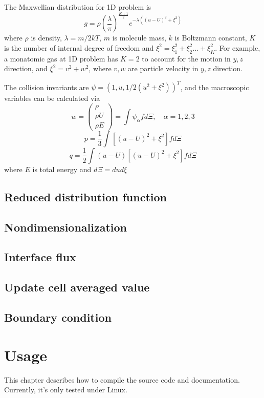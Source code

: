 \documentclass{book}
\begin{document}
The Maxwellian distribution for 1D problem is
\begin{equation}
    g=\rho\left(\frac{\lambda}{\pi}\right)^{\frac{K+1}{2}}e^{-\lambda((u-U)^2+\xi^2)}
\end{equation}
where $\rho$ is density, $\lambda=m/2kT$, $m$ is molecule mass, $k$ is Boltzmann constant, $K$ is the number of internal degree of freedom and $\xi^2=\xi_1^2+\xi_2^2...+\xi_K^2$. For example, a monatomic gas at 1D problem has $K=2$ to account for the motion in $y,z$ direction, and $\xi^2=v^2+w^2$, where $v,w$ are particle velocity in $y,z$ direction.

The collision invariants are $\psi=(1,u,1/2(u^2+\xi^2))^T$, and the macroscopic variables can be calculated via
\begin{equation}
    w=\begin{pmatrix} \rho\\ \rho U\\ \rho E \end{pmatrix} = \int \psi_\alpha fd\Xi,\quad \alpha=1,2,3
\end{equation}
\begin{equation}
    p=\frac{1}{3}\int [(u-U)^2+\xi^2]fd\Xi
\end{equation}
\begin{equation}
    q=\frac{1}{2}\int (u-U)[(u-U)^2+\xi^2]fd\Xi
\end{equation}
where $E$ is total energy and $d\Xi=dud\xi$


\section{Reduced distribution function}
\section{Nondimensionalization}
\section{Interface flux}
\section{Update cell averaged value}
\section{Boundary condition}

\chapter{Usage}
This chapter describes how to compile the source code and documentation.
Currently, it's only tested under Linux.
\end{document}
